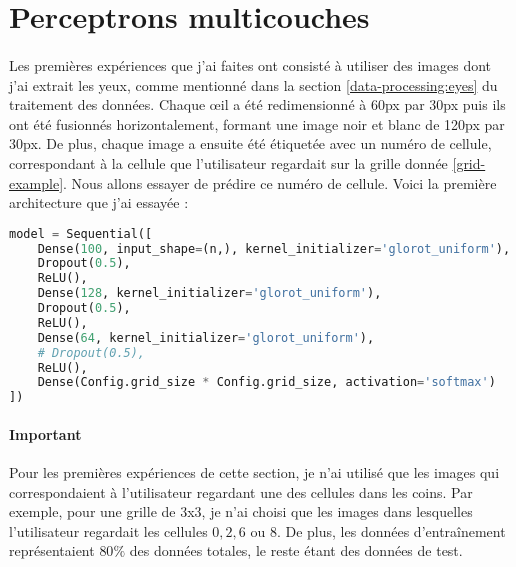 \section{Perceptrons multicouches}
\paragraph{}
Les premières expériences que j'ai faites ont consisté à utiliser des images dont j'ai extrait les yeux, comme mentionné dans la section \ref{data-processing:eyes} du traitement des données.
Chaque œil a été redimensionné à 60px par 30px puis ils ont été fusionnés horizontalement, formant une image noir et blanc de 120px par 30px.
De plus, chaque image a ensuite été étiquetée avec un numéro de cellule, correspondant à la cellule que l'utilisateur regardait sur la grille donnée \ref{grid-example}.
Nous allons essayer de prédire ce numéro de cellule.
Voici la première architecture que j'ai essayée :

\begin{lstlisting}[language=Python, caption=MLP 1]
model = Sequential([
    Dense(100, input_shape=(n,), kernel_initializer='glorot_uniform'),
    Dropout(0.5),
    ReLU(),
    Dense(128, kernel_initializer='glorot_uniform'),
    Dropout(0.5),
    ReLU(),
    Dense(64, kernel_initializer='glorot_uniform'),
    # Dropout(0.5),
    ReLU(),
    Dense(Config.grid_size * Config.grid_size, activation='softmax')
])
\end{lstlisting}

\paragraph{Important}
Pour les premières expériences de cette section, je n'ai utilisé que les images qui correspondaient à l'utilisateur regardant une des cellules dans les coins.
Par exemple, pour une grille de 3x3, je n'ai choisi que les images dans lesquelles l'utilisateur regardait les cellules $0, 2, 6$ ou $8$.
De plus, les données d'entraînement représentaient $80\%$ des données totales, le reste étant des données de test.

